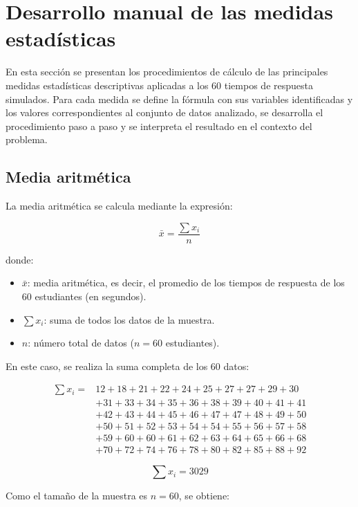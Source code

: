 \documentclass[12pt,letterpaper]{article}
\begin{document}
\section{Desarrollo manual de las medidas estadísticas}
\label{sec:desarrollo}

En esta sección se presentan los procedimientos de cálculo de las principales medidas estadísticas descriptivas aplicadas a los 60 tiempos de respuesta simulados. Para cada medida se define la fórmula con sus variables identificadas y los valores correspondientes al conjunto de datos analizado, se desarrolla el procedimiento paso a paso y se interpreta el resultado en el contexto del problema.

\subsection{Media aritmética}

La media aritmética se calcula mediante la expresión:

\[
\bar{x}=\frac{\sum x_i}{n}
\]

donde:
\begin{itemize}[leftmargin=1.2cm]
    \item $\bar{x}$: media aritmética, es decir, el promedio de los tiempos de respuesta de los 60 estudiantes (en segundos).
    \item $\sum x_i$: suma de todos los datos de la muestra.
    \item $n$: número total de datos ($n = 60$ estudiantes).
\end{itemize}

En este caso, se realiza la suma completa de los 60 datos:

\begin{align*}
\sum x_i = &12+18+21+22+24+25+27+27+29+30 \\
&+31+33+34+35+36+38+39+40+41+41 \\
&+42+43+44+45+46+47+47+48+49+50 \\
&+50+51+52+53+54+54+55+56+57+58 \\
&+59+60+60+61+62+63+64+65+66+68 \\
&+70+72+74+76+78+80+82+85+88+92
\end{align*}

\[
\sum x_i = 3029
\]

Como el tamaño de la muestra es $n=60$, se obtiene:
\end{document}
